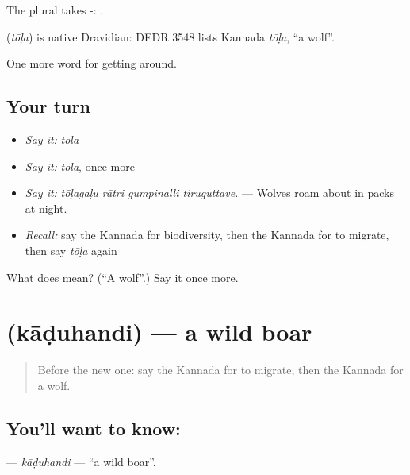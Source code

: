The plural takes -: .

\begin{cousinweb}
\textbf{} (\emph{tōḷa}) is native Dravidian: DEDR 3548 lists Kannada \emph{tōḷa}, \textquotedblleft{}a wolf\textquotedblright{}.
\end{cousinweb}

\begin{grammarlens}[title={What you've built}]
One more word for getting around.
\end{grammarlens}

\subsection*{Your turn}
\begin{itemize}
\raggedright
  \item \emph{Say it:} \emph{tōḷa}
  \item \emph{Say it:} \emph{tōḷa}, once more
  \item \emph{Say it:} \emph{tōḷagaḷu rātri gumpinalli tiruguttave.} — Wolves roam about in packs at night.
  \item \emph{Recall:} say the Kannada for biodiversity, then the Kannada for to migrate, then say \emph{tōḷa} again
\end{itemize}

\begin{tcolorbox}[breakable,colback=teal!4,colframe=teal!35!black,title={Before you move on}]
What does  mean? (\textquotedblleft{}A wolf\textquotedblright{}.) Say it once more.
\end{tcolorbox}
\section[\texorpdfstring{\kn{ಕಾಡುಹಂದಿ} (kāḍuhandi)}{ಕಾಡುಹಂದಿ (kāḍuhandi)}]{ (kāḍuhandi) — a wild boar}

\label{lesson:KA-C477-kaduhandi}



\begin{quote}
Before the new one: say the Kannada for to migrate, then the Kannada for a wolf.
\end{quote}

\subsection*{You'll want to know: }
\textbf{} — \emph{kāḍuhandi} — \textquotedblleft{}a wild boar\textquotedblright{}.

